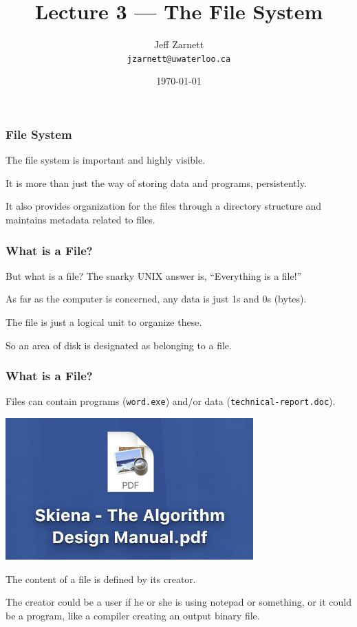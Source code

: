 

\title{Lecture 3 --- The File System }

\author{Jeff Zarnett \\ \small \texttt{jzarnett@uwaterloo.ca}}
\date{\today}




\begin{frame}
  \titlepage

 \end{frame}



\begin{frame}
\frametitle{File System}

The file system is important and highly visible.

It is more than just the way of storing data and programs, persistently.

It also provides organization for the files through a directory structure and maintains metadata related to files. 

\end{frame}

\begin{frame}
\frametitle{What is a File?}

But what is a file? The snarky UNIX answer is, ``Everything is a file!''

As far as the computer is concerned, any data is just 1s and 0s (bytes). 

The file is just a logical unit to organize these. 

So an area of disk is designated as belonging to a file. 

\end{frame}

\begin{frame}
\frametitle{What is a File?}

Files can contain programs (\texttt{word.exe}) and/or data (\texttt{technical-report.doc}). 

\begin{center}
\includegraphics{images/file.png}
\end{center}

The content of a file is defined by its creator. 

The creator could be a user if he or she is using notepad or something, or it could be a program, like a compiler creating an output binary file.

\end{frame}

